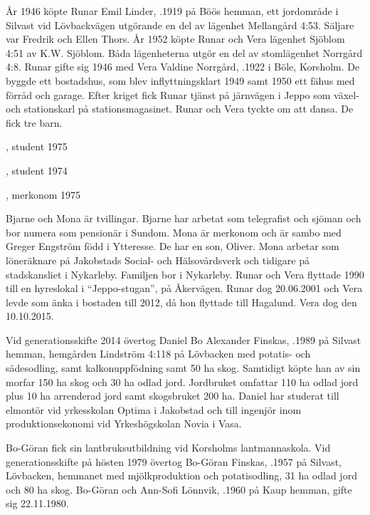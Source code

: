 År 1946 köpte Runar Emil Linder, .1919 på Böös hemman, ett jordområde i Silvast vid Lövbackvägen utgörande en del av lägenhet Mellangård	4:53. Säljare var Fredrik och Ellen Thors. År 1952 köpte Runar och Vera lägenhet Sjöblom 4:51 av K.W. Sjöblom. Båda lägenheterna utgör en del av stomlägenhet Norrgård 4:8. Runar gifte sig 1946 med Vera Valdine Norrgård, .1922 i Böle, Korsholm. De byggde ett bostadshus, som blev inflyttningsklart 1949 samt 1950 ett 	fähus med förråd och garage. Efter kriget fick Runar tjänst på järnvägen i Jeppo som växel- och stationskarl på stationsmagasinet. Runar och Vera tyckte om att dansa. De fick tre barn.
\begin{jhchildren}
  \item {}, student 1975
  \item {}, student 1974
  \item {}, merkonom 1975
\end{jhchildren}
Bjarne och Mona är tvillingar. Bjarne har arbetat som telegrafist och sjöman och bor numera som pensionär i Sundom. Mona är merkonom och är sambo med Greger Engström född i Ytteresse. De har en son, Oliver. Mona arbetar som löneräknare på Jakobstads Social- och Hälsovårdsverk och tidigare på stadskansliet i Nykarleby. Familjen bor i Nykarleby.
Runar och Vera flyttade 1990 till en hyreslokal i ``Jeppo-stugan'', på 	Åkervägen. Runar dog 20.06.2001 och Vera levde som änka i bostaden till 2012, då hon flyttade till Hagalund. Vera dog den 10.10.2015.






Vid generationsskifte 2014 övertog Daniel Bo Alexander Finskas, .1989 på Silvast hemman, hemgården Lindström 4:118 på Lövbacken med potatis- och sädesodling, samt kalkonuppfödning samt 50 ha skog. Samtidigt köpte han av sin morfar 150 ha skog och 30 ha odlad jord. Jordbruket omfattar 110 ha odlad jord plus 10 ha arrenderad jord samt skogsbruket 200 ha. Daniel har studerat till elmontör vid yrkesskolan Optima i Jakobstad och till ingenjör inom produktionsekonomi vid Yrkeshögskolan Novia i Vasa.


Bo-Göran fick sin lantbruksutbildning vid Korsholms lantmannaskola. Vid generationsskifte på hösten 1979 övertog Bo-Göran Finskas, .1957 på Silvast, Lövbacken, hemmanet med mjölkproduktion och potatisodling, 31 ha odlad jord och 80 ha skog. Bo-Göran och Ann-Sofi Lönnvik, .1960 på Kaup hemman, gifte sig 22.11.1980.

